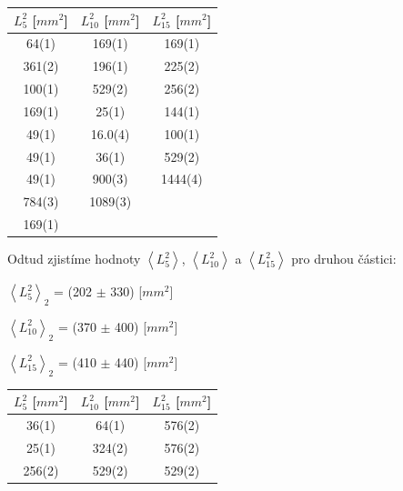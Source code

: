 \documentclass[a4paper,11pt]{article}
\begin{document}
    \begin{minipage}{0.5\textwidth} 
        \centering
        \begin{tabular}{|c|c|c|}
            \hline
            $L_5^2$ [$mm^2$] & $L_{10}^2$ [$mm^2$] & $L_{15}^2$ [$mm^2$] \\
            \hline
            64(1) & 169(1) & 169(1) \\
            361(2) & 196(1) & 225(2) \\
            100(1) & 529(2) & 256(2) \\
            169(1) & 25(1) & 144(1) \\
            49(1) & 16.0(4) & 100(1) \\
            49(1) & 36(1) & 529(2) \\
            49(1) & 900(3) & 1444(4) \\
            784(3) & 1089(3) &  \\
            169(1) &  &  \\
            \hline
            \end{tabular}
            \captionsetup{justification=centering, font=footnotesize}
        \vspace{15pt}
        \raggedright
        Odtud zjistíme hodnoty $\left\langle L_{5}^2\right\rangle$, $\left\langle L_{10}^2\right\rangle$ a $\left\langle L_{15}^2\right\rangle$ pro druhou částici: 
        \begin{center}
            $\left\langle L_{5}^2\right\rangle_2$ = (202 $\pm$ 330) [$mm^2$]
            \vspace{5pt}
            \par $\left\langle L_{10}^2\right\rangle_2$ = (370 $\pm$ 400) [$mm^2$]
            \vspace{5pt}
            \par $\left\langle L_{15}^2\right\rangle_2$ = (410 $\pm$ 440) [$mm^2$]
        \end{center}
        \vspace{15pt}
        \centering
        \begin{tabular}{|c|c|c|}
            \hline
            $L_5^2$ [$mm^2$] & $L_{10}^2$ [$mm^2$] & $L_{15}^2$ [$mm^2$] \\
            \hline
            36(1) & 64(1) & 576(2) \\
            25(1) & 324(2) & 576(2) \\
            256(2) & 529(2) & 529(2) \\

\end{tabular}
\end{minipage}
\end{document}
